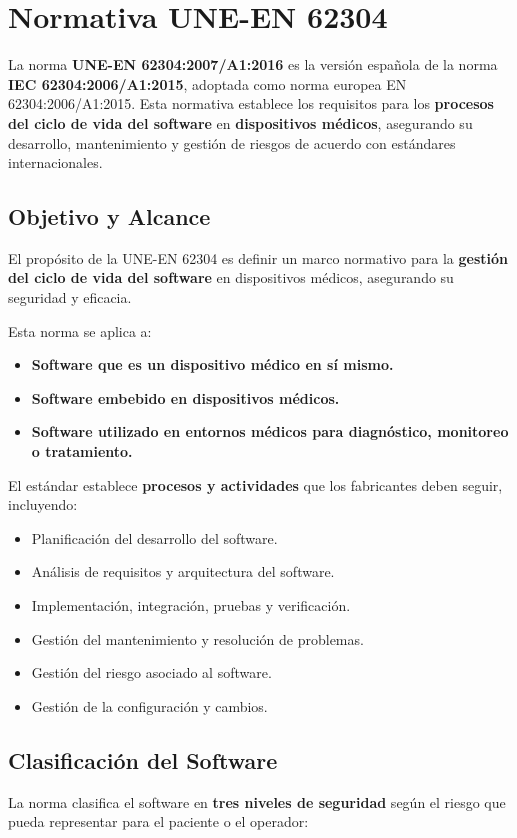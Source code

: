 \chapter{Normativa UNE-EN 62304}\label{ch:regulatory_framework}

La norma \textbf{UNE-EN 62304:2007/A1:2016} \cite{UNE-EN-62304} es la versión española de la norma \textbf{IEC 62304:2006/A1:2015}, adoptada como norma europea EN 62304:2006/A1:2015. Esta normativa establece los requisitos para los \textbf{procesos del ciclo de vida del software} en \textbf{dispositivos médicos}, asegurando su desarrollo, mantenimiento y gestión de riesgos de acuerdo con estándares internacionales.

\section{Objetivo y Alcance}
El propósito de la UNE-EN 62304 \cite{UNE-EN-62304} es definir un marco normativo para la \textbf{gestión del ciclo de vida del software} en dispositivos médicos, asegurando su seguridad y eficacia. 

Esta norma se aplica a:
\begin{itemize}
    \item \textbf{Software que es un dispositivo médico en sí mismo.}
    \item \textbf{Software embebido en dispositivos médicos.}
    \item \textbf{Software utilizado en entornos médicos para diagnóstico, monitoreo o tratamiento.}
\end{itemize}

El estándar establece \textbf{procesos y actividades} que los fabricantes deben seguir, incluyendo:
\begin{itemize}
    \item Planificación del desarrollo del software.
    \item Análisis de requisitos y arquitectura del software.
    \item Implementación, integración, pruebas y verificación.
    \item Gestión del mantenimiento y resolución de problemas.
    \item Gestión del riesgo asociado al software.
    \item Gestión de la configuración y cambios.
\end{itemize}

\newpage
\section{Clasificación del Software}
La norma clasifica el software en \textbf{tres niveles de seguridad} según el riesgo que pueda representar para el paciente o el operador:

